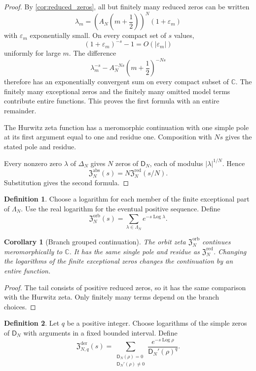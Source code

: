 \documentclass{aomart}
\newtheorem{corollary}[corollary]{Corollary}
\theoremstyle{definition}
\newtheorem{definition}[definition]{Definition}
\theoremstyle{remark}
\newcommand{\CC}{\mathbb C}
\newcommand{\Dfun}{\mathsf D}
\newcommand{\Log}{\operatorname{Log}}
\begin{document}
\begin{proof}
By \cref{cor:reduced_zeros}, all but finitely many reduced zeros can be written
\[
\lambda_m
=
\left(A_N\left(m+\frac12\right)\right)^N(1+\varepsilon_m)
\]
with $\varepsilon_m$ exponentially small.  On every compact set of $s$ values,
\[
(1+\varepsilon_m)^{-s}-1
=
O(|\varepsilon_m|)
\]
uniformly for large $m$.  The difference
\[
\lambda_m^{-s}
-
A_N^{-Ns}\left(m+\frac12\right)^{-Ns}
\]
therefore has an exponentially convergent sum on every compact subset of $\CC$.  The finitely many exceptional zeros and the finitely many omitted model terms contribute entire functions.  This proves the first formula with an entire remainder.

The Hurwitz zeta function has a meromorphic continuation with one simple pole at its first argument equal to one and residue one.  Composition with $Ns$ gives the stated pole and residue.

Every nonzero zero $\lambda$ of $\Delta_N$ gives $N$ zeros of $\Dfun_N$, each of modulus $|\lambda|^{1/N}$.  Hence
\[
\mathfrak Z_N^{\mathrm{abs}}(s)
=
N\mathfrak Z_N^{\mathrm{red}}(s/N).
\]
Substitution gives the second formula.
\end{proof}

\begin{definition}\label{def:branch_orbit_zeta}
Choose a logarithm for each member of the finite exceptional part of $\Lambda_N$.  Use the real logarithm for the eventual positive sequence.  Define
\[
\mathfrak Z_N^{\mathrm{orb}}(s)
=
\sum_{\lambda\in\Lambda_N}e^{-s\Log\lambda}.
\]
\end{definition}

\begin{corollary}[Branch grouped continuation]\label{cor:branch_grouped_continuation}
The orbit zeta $\mathfrak Z_N^{\mathrm{orb}}$ continues meromorphically to $\CC$.  It has the same single pole and residue as $\mathfrak Z_N^{\mathrm{red}}$.  Changing the logarithms of the finite exceptional zeros changes the continuation by an entire function.
\end{corollary}

\begin{proof}
The tail consists of positive reduced zeros, so it has the same comparison with the Hurwitz zeta.  Only finitely many terms depend on the branch choices.
\end{proof}

\begin{definition}\label{def:derivative_weighted_zeta}
Let $q$ be a positive integer.  Choose logarithms of the simple zeros of $\Dfun_N$ with arguments in a fixed bounded interval.  Define
\[
\mathfrak Z_{N,q}^{\mathrm{der}}(s)
=
\sum_{\substack{\Dfun_N(\rho)=0\\ \Dfun_N'(\rho)\ne0}}
\frac{e^{-s\Log\rho}}{\Dfun_N'(\rho)^q}.
\]
\end{definition}
\end{document}
